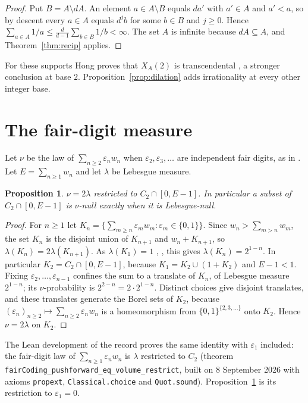 \documentclass[11pt]{amsart}
\newtheorem{proposition}[theorem]{Proposition}
\begin{document}
\begin{proof}
Put $B=A\setminus dA$. An element $a\in A\setminus B$ equals $da'$ with
$a'\in A$ and $a'<a$, so by descent every $a\in A$ equals $d^jb$ for some
$b\in B$ and $j\ge0$. Hence
$\sum_{a\in A}1/a\le\frac{d}{d-1}\sum_{b\in B}1/b<\infty$. The set $A$ is
infinite because $dA\subseteq A$, and Theorem~\ref{thm:recip} applies.
\end{proof}

For these supports Hong proves that $X_A(2)$ is transcendental
\cite[Proposition~9.2]{hong}, a stronger conclusion at base $2$.
Proposition~\ref{prop:dilation} adds irrationality at every other integer base.

\section{The fair-digit measure}

Let $\nu$ be the law of $\sum_{n\ge2}\varepsilon_nw_n$ when
$\varepsilon_2,\varepsilon_3,\dots$ are independent fair digits, as in
\cite[\S8]{hong}. Let $E=\sum_{n\ge1}w_n$ and let $\lambda$ be Lebesgue measure.

\begin{proposition}\label{prop:fair}
$\nu=2\lambda$ restricted to $C_2\cap[0,E-1]$. In particular a subset of
$C_2\cap[0,E-1]$ is $\nu$-null exactly when it is Lebesgue-null.
\end{proposition}

\begin{proof}
For $n\ge1$ let $K_n=\bigl\{\sum_{m\ge n}\varepsilon_mw_m:\varepsilon_m\in\{0,1\}\bigr\}$.
Since $w_n>\sum_{m>n}w_m$, the set $K_n$ is the disjoint union of $K_{n+1}$ and
$w_n+K_{n+1}$, so $\lambda(K_n)=2\lambda(K_{n+1})$. As $\lambda(K_1)=1$
\cite[\S2.1]{hong}, \cite[\S C.2]{cooknote}, this gives $\lambda(K_n)=2^{1-n}$.
In particular $K_2=C_2\cap[0,E-1]$, because $K_1=K_2\cup(1+K_2)$ and $E-1<1$.
Fixing $\varepsilon_2,\dots,\varepsilon_{n-1}$ confines the sum to a translate
of $K_n$, of Lebesgue measure $2^{1-n}$; its $\nu$-probability is
$2^{2-n}=2\cdot2^{1-n}$. Distinct choices give disjoint translates, and these
translates generate the Borel sets of $K_2$, because
$(\varepsilon_n)_{n\ge2}\mapsto\sum_{n\ge2}\varepsilon_nw_n$ is a homeomorphism
from $\{0,1\}^{\{2,3,\dots\}}$ onto $K_2$. Hence $\nu=2\lambda$ on $K_2$.
\end{proof}

The Lean development of the record proves the same identity with
$\varepsilon_1$ included: the fair-digit law of $\sum_{n\ge1}\varepsilon_nw_n$ is
$\lambda$ restricted to $C_2$ (theorem
\texttt{fairCoding\_pushforward\_eq\_volume\_restrict}, built on 8 September
2026 with axioms \texttt{propext}, \texttt{Classical.choice} and
\texttt{Quot.sound}). Proposition~\ref{prop:fair} is its restriction to
$\varepsilon_1=0$.
\end{document}
